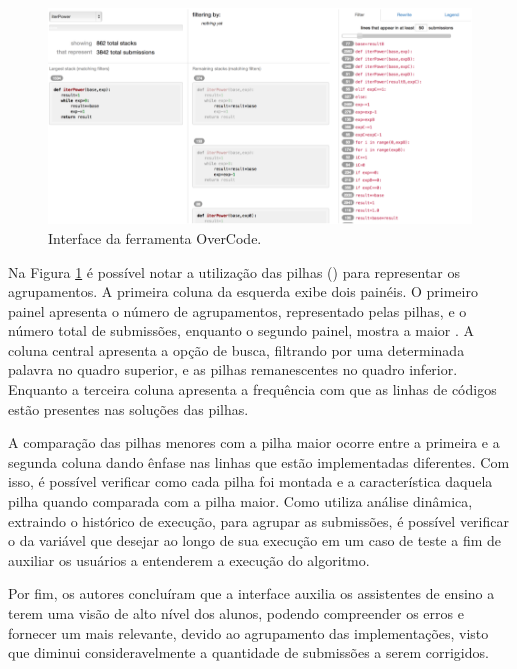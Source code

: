 	    \begin{figure}[ht]
	        \centering
	        \includegraphics[scale=0.4]{imagem/overCode.png}
	        \captionsetup{justification=centering}
	        \caption{Interface da ferramenta OverCode.}
	        \label{fig:interfaceOverCode}
	    \end{figure}
	    
		Na Figura \ref{fig:interfaceOverCode} é possível notar a utilização das pilhas
		() para representar os agrupamentos. A primeira coluna da
		esquerda exibe dois painéis. O primeiro painel apresenta o número de
		agrupamentos, representado pelas pilhas, e o número total de submissões,
		enquanto o segundo painel, mostra a maior . A coluna central
		apresenta a opção de busca, filtrando por uma determinada palavra no quadro
		superior, e as pilhas remanescentes no quadro inferior. Enquanto a terceira
		coluna apresenta a frequência com que as linhas de códigos estão presentes
		nas soluções das pilhas.

		A comparação das pilhas menores com a pilha maior ocorre entre a primeira e a
	    segunda coluna dando ênfase nas linhas que estão implementadas diferentes. Com
	    isso, é possível verificar como cada pilha foi montada e a característica daquela
	    pilha quando comparada com a pilha maior. Como utiliza análise dinâmica, extraindo
	    o histórico de execução, para agrupar as submissões, é possível verificar o 
	    da variável que desejar ao longo de sua execução em um caso de teste a fim de
	    auxiliar os usuários a entenderem a execução do algoritmo.

	    Por fim, os autores concluíram que a interface auxilia os assistentes de
	    ensino a terem uma visão de alto nível dos alunos, podendo compreender os
	    erros e fornecer um  mais relevante, devido ao agrupamento
	    das implementações, visto que diminui consideravelmente a quantidade de
	    submissões a serem corrigidos.
	    
